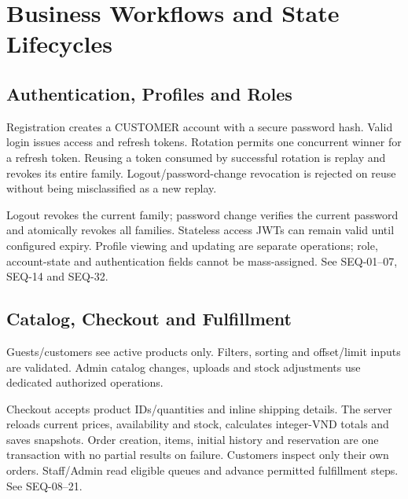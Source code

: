 \chapter{Business Workflows and State Lifecycles}
\section{Authentication, Profiles and Roles}
Registration creates a CUSTOMER account with a secure password hash. Valid login issues access and refresh tokens. Rotation permits one concurrent winner for a refresh token. Reusing a token consumed by successful rotation is replay and revokes its entire family. Logout/password-change revocation is rejected on reuse without being misclassified as a new replay.

Logout revokes the current family; password change verifies the current password and atomically revokes all families. Stateless access JWTs can remain valid until configured expiry. Profile viewing and updating are separate operations; role, account-state and authentication fields cannot be mass-assigned. See SEQ-01--07, SEQ-14 and SEQ-32.

\section{Catalog, Checkout and Fulfillment}
Guests/customers see active products only. Filters, sorting and offset/limit inputs are validated. Admin catalog changes, uploads and stock adjustments use dedicated authorized operations.

Checkout accepts product IDs/quantities and inline shipping details. The server reloads current prices, availability and stock, calculates integer-VND totals and saves snapshots. Order creation, items, initial history and reservation are one transaction with no partial results on failure. Customers inspect only their own orders. Staff/Admin read eligible queues and advance permitted fulfillment steps. See SEQ-08--21.

